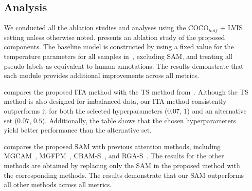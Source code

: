 


\subsection{Analysis}
We conducted all the ablation studies and analyses using the COCO$_{half}$ + LVIS setting unless otherwise noted.  presents an ablation study of the proposed components. The baseline model is constructed by using a fixed value for the temperature parameters for all samples in~, excluding SAM, and treating all pseudo-labels as equivalent to human annotations. The results demonstrate that each module provides additional improvements across all metrics.





 compares the proposed ITA method with the TS method from~\cite{kukleva2023temperature}. Although the TS method is also designed for imbalanced data, our ITA method consistently outperforms it for both the selected hyperparameters ($0.07$, $1$) and an alternative set ($0.07$, $0.5$). Additionally, the table shows that the chosen hyperparameters yield better performance than the alternative set.


 compares the proposed SAM with previous attention methods, including MGCAM~\cite{song2018mask}, MGFPM~\cite{wang2021mask}, CBAM-S~\cite{woo2018cbam}, and RGA-S~\cite{zhang2020relation}. The results for the other methods are obtained by replacing only the SAM in the proposed method with the corresponding methods. The results demonstrate that our SAM outperforms all other methods across all metrics.


